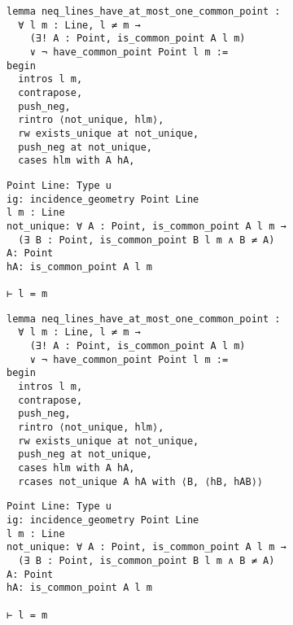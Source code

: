 \begin{frame}[fragile]
	\begin{multicols}{2}
		\begin{lstlisting}
lemma neq_lines_have_at_most_one_common_point :
  ∀ l m : Line, l ≠ m → 
    (∃! A : Point, is_common_point A l m) 
    ∨ ¬ have_common_point Point l m := 
begin
  intros l m,
  contrapose,
  push_neg,
  rintro ⟨not_unique, hlm⟩,
  rw exists_unique at not_unique,
  push_neg at not_unique,
  cases hlm with A hA,
\end{lstlisting}
		\columnbreak
		\begin{lstlisting}
Point Line: Type u
ig: incidence_geometry Point Line
l m : Line
not_unique: ∀ A : Point, is_common_point A l m → 
  (∃ B : Point, is_common_point B l m ∧ B ≠ A)
A: Point
hA: is_common_point A l m

⊢ l = m
		\end{lstlisting}
	\end{multicols}
\end{frame}










\begin{frame}[fragile]
	\begin{multicols}{2}
		\begin{lstlisting}
lemma neq_lines_have_at_most_one_common_point :
  ∀ l m : Line, l ≠ m → 
    (∃! A : Point, is_common_point A l m) 
    ∨ ¬ have_common_point Point l m := 
begin
  intros l m,
  contrapose,
  push_neg,
  rintro ⟨not_unique, hlm⟩,
  rw exists_unique at not_unique,
  push_neg at not_unique,
  cases hlm with A hA,
  rcases not_unique A hA with ⟨B, ⟨hB, hAB⟩⟩
\end{lstlisting}
		\columnbreak
		\begin{lstlisting}
Point Line: Type u
ig: incidence_geometry Point Line
l m : Line
not_unique: ∀ A : Point, is_common_point A l m → 
  (∃ B : Point, is_common_point B l m ∧ B ≠ A)
A: Point
hA: is_common_point A l m

⊢ l = m
		\end{lstlisting}
	\end{multicols}
\end{frame}










